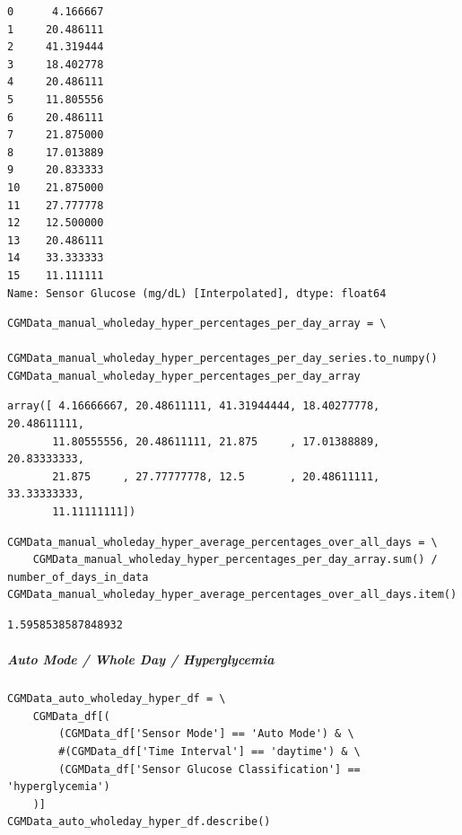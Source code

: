 \begin{verbatim}
0      4.166667
1     20.486111
2     41.319444
3     18.402778
4     20.486111
5     11.805556
6     20.486111
7     21.875000
8     17.013889
9     20.833333
10    21.875000
11    27.777778
12    12.500000
13    20.486111
14    33.333333
15    11.111111
Name: Sensor Glucose (mg/dL) [Interpolated], dtype: float64
\end{verbatim}

\begin{verbatim}
CGMData_manual_wholeday_hyper_percentages_per_day_array = \
    CGMData_manual_wholeday_hyper_percentages_per_day_series.to_numpy()
CGMData_manual_wholeday_hyper_percentages_per_day_array
\end{verbatim}

\begin{verbatim}
array([ 4.16666667, 20.48611111, 41.31944444, 18.40277778, 20.48611111,
       11.80555556, 20.48611111, 21.875     , 17.01388889, 20.83333333,
       21.875     , 27.77777778, 12.5       , 20.48611111, 33.33333333,
       11.11111111])
\end{verbatim}

\begin{verbatim}
CGMData_manual_wholeday_hyper_average_percentages_over_all_days = \
    CGMData_manual_wholeday_hyper_percentages_per_day_array.sum() / number_of_days_in_data
CGMData_manual_wholeday_hyper_average_percentages_over_all_days.item()
\end{verbatim}

\begin{verbatim}
1.5958538587848932
\end{verbatim}

\subparagraph{Auto Mode / Whole Day / Hyperglycemia}

\begin{verbatim}
CGMData_auto_wholeday_hyper_df = \
    CGMData_df[(
        (CGMData_df['Sensor Mode'] == 'Auto Mode') & \
        #(CGMData_df['Time Interval'] == 'daytime') & \
        (CGMData_df['Sensor Glucose Classification'] == 'hyperglycemia')
    )]
CGMData_auto_wholeday_hyper_df.describe()
\end{verbatim}

